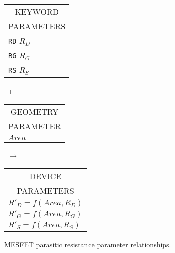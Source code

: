 \begin{figure}[h]
\parbox[t]{1.3in}{
\begin{tabular}[t]{|p{1in}|}
\hline
\multicolumn{1}{|c|}{KEYWORD} \\
\multicolumn{1}{|c|}{PARAMETERS} \\
\hline
\hline
{\tt RD} \hfill $R_D$\\
{\tt RG} \hfill $R_G$\\
{\tt RS} \hfill $R_S$\\
\hline
\end{tabular}
}
\hfill
\parbox{0.2in}{\ \vspace*{0.2in}\newline +}
\hfill
\begin{tabular}[t]{|p{1in}|}
\hline
\multicolumn{1}{|c|}{GEOMETRY} \\
\multicolumn{1}{|c|}{PARAMETER} \\
\hline
$Area$\\
\hline
\end{tabular}
\hfill
\parbox{0.2in}{\ \vspace*{0.2in}\newline $\rightarrow$}
\hfill
\begin{tabular}[t]{|p{1.8in}|}
\hline
\multicolumn{1}{|c|}{DEVICE}\\
\multicolumn{1}{|c|}{PARAMETERS}\\
\hline
\hspace*{\fill} $R'_D = f(Area, R_D)$\\
\hspace*{\fill} $R'_G = f(Area, R_G)$\\
\hspace*{\fill} $R'_S = f(Area, R_S)$\\
\hline
\end{tabular}
\caption{MESFET parasitic resistance parameter
relationships. \label{b6para}}
\end{figure}

